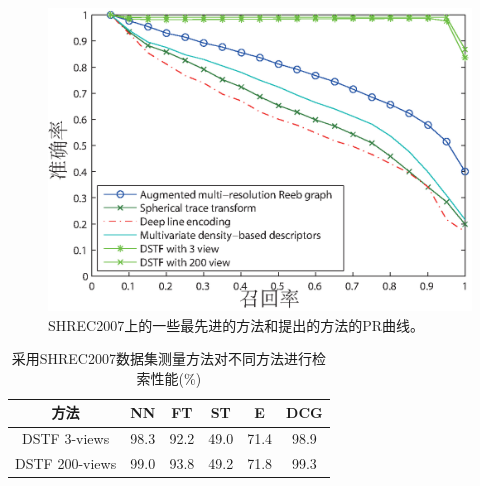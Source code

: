 \begin{figure}[tbhp]
\begin{center}
\includegraphics[width=1\linewidth]{figures/all_rp_cl_shrec2007.eps}
\end{center} 
\vspace{-4mm}
\caption{SHREC2007上的一些最先进的方法和提出的方法的PR曲线。} \label{fig_rp_shrec2007}
\end{figure}

\begin{table}[tbhp]

\caption{采用SHREC2007数据集测量方法对不同方法进行检索性能(\%)} \label{table_retrieval_results_shrec2007}
\begin{center}
\begin{tabular}{cccccc}  %
\hline  \hline
方法	    &NN     &FT     &ST     &E      &DCG \\ 
\hline 
DSTF 3-views		&98.3	&92.2	&49.0	&71.4	&98.9	\\
DSTF	200-views	&99.0		&93.8	&49.2	&71.8	&99.3	\\
\hline  \hline      
\end{tabular}
\end{center} 
\end{table}



